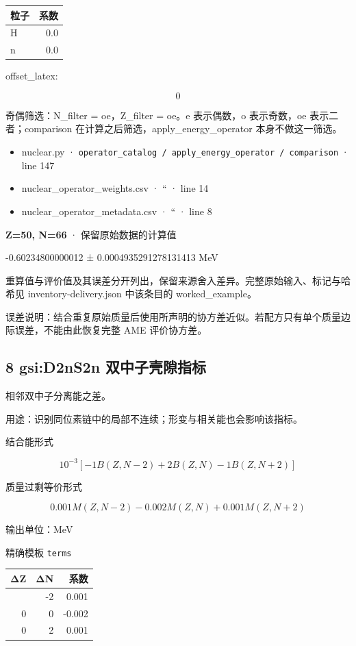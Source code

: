 \documentclass[
  11pt,
  letterpaper,
]{article}
\providecommand{\tightlist}{%
  \setlength{\itemsep}{0pt}\setlength{\parskip}{0pt}}
\begin{document}
\begin{longtable}[]{@{}lr@{}}
\toprule\noalign{}
粒子 & 系数 \\
\midrule\noalign{}
\endhead
\bottomrule\noalign{}
\endlastfoot
H & 0.0 \\
n & 0.0 \\
\end{longtable}

offset\_latex:

\[
0
\]

奇偶筛选：N\_filter = oe，Z\_filter = oe。e 表示偶数，o 表示奇数，oe
表示二者；comparison 在计算之后筛选，apply\_energy\_operator
本身不做这一筛选。

\begin{itemize}
\tightlist
\item
  nuclear.py ·
  \texttt{operator\_catalog\ /\ apply\_energy\_operator\ /\ comparison}
  · line 147
\item
  nuclear\_operator\_weights.csv · `` · line 14
\item
  nuclear\_operator\_metadata.csv · `` · line 8
\end{itemize}

\textbf{Z=50, N=66} · 保留原始数据的计算值

-0.60234800000012 ± 0.0004935291278131413 MeV

重算值与评价值及其误差分开列出，保留来源舍入差异。完整原始输入、标记与哈希见
inventory-delivery.json 中该条目的 worked\_example。

误差说明：结合重复原始质量后使用所声明的协方差近似。若配方只有单个质量边际误差，不能由此恢复完整
AME 评价协方差。

\subsection{8 gsi:D2nS2n
双中子壳隙指标}\label{gsid2ns2n-ux53ccux4e2dux5b50ux58f3ux9699ux6307ux6807}

相邻双中子分离能之差。

用途：识别同位素链中的局部不连续；形变与相关能也会影响该指标。

结合能形式

\[
10^{-3}[-1B(Z,N-2)+2B(Z,N)-1B(Z,N+2)]
\]

质量过剩等价形式

\[
0.001M(Z,N-2)-0.002M(Z,N)+0.001M(Z,N+2)
\]

输出单位：MeV

精确模板 \texttt{terms}

\begin{longtable}[]{@{}rrr@{}}
\toprule\noalign{}
ΔZ & ΔN & 系数 \\
\midrule\noalign{}
\endhead
\bottomrule\noalign{}
\endlastfoot
0 & -2 & 0.001 \\
0 & 0 & -0.002 \\
0 & 2 & 0.001 \\
\end{longtable}
\end{document}
